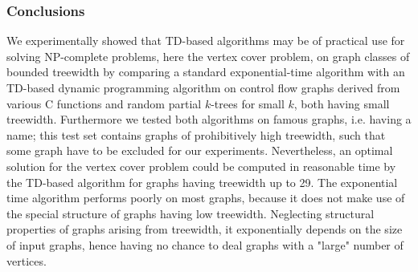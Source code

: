 \documentclass[11pt]{beamer}
\begin{document}
\begin{frame}
\frametitle{Conclusions}

We experimentally showed that TD-based algorithms may be of practical use for solving NP-complete problems, here the vertex cover problem, on graph classes of bounded treewidth by comparing a standard exponential-time algorithm with an TD-based dynamic programming algorithm on control flow graphs derived from various C functions and random partial $k$-trees for small $k$, both having small treewidth. Furthermore we tested both algorithms on famous graphs, i.e. having a name; this test set contains graphs of prohibitively high treewidth, such that some graph have to be excluded for our experiments. Nevertheless, an optimal solution for the vertex cover problem could be computed in reasonable time by the TD-based algorithm for graphs having treewidth up to 29. The exponential time algorithm performs poorly on most graphs, because it does not make use of the special structure of graphs having low treewidth. Neglecting structural properties of graphs arising from treewidth, it exponentially depends on the size of input graphs, hence having no chance to deal graphs with a "large" number of vertices.

\end{frame}
\end{document}
